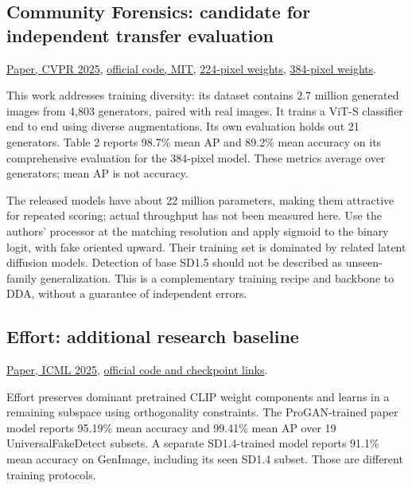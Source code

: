 \subsection{Community Forensics: candidate for independent transfer
evaluation}\label{record-docs-image-defenders-md-community-forensics-candidate-for-independent-transfer-evaluation}

\href{https://arxiv.org/pdf/2411.04125v2}{Paper, CVPR 2025},
\href{https://github.com/JeongsooP/Community-Forensics}{official code,
MIT}, \href{https://huggingface.co/OwensLab/commfor-model-224}{224-pixel
weights},
\href{https://huggingface.co/OwensLab/commfor-model-384}{384-pixel
weights}.

This work addresses training diversity: its dataset contains 2.7 million
generated images from 4,803 generators, paired with real images. It
trains a ViT-S classifier end to end using diverse augmentations. Its
own evaluation holds out 21 generators. Table 2 reports 98.7\% mean AP
and 89.2\% mean accuracy on its comprehensive evaluation for the
384-pixel model. These metrics average over generators; mean AP is not
accuracy.

The released models have about 22 million parameters, making them
attractive for repeated scoring; actual throughput has not been measured
here. Use the authors' processor at the matching resolution and apply
sigmoid to the binary logit, with fake oriented upward. Their training
set is dominated by related latent diffusion models. Detection of base
SD1.5 should not be described as unseen-family generalization. This is a
complementary training recipe and backbone to DDA, without a guarantee
of independent errors.

\subsection{Effort: additional research
baseline}\label{record-docs-image-defenders-md-effort-additional-research-baseline}

\href{https://arxiv.org/pdf/2411.15633v4}{Paper, ICML 2025},
\href{https://github.com/YZY-stack/Effort-AIGI-Detection}{official code
and checkpoint links}.

Effort preserves dominant pretrained CLIP weight components and learns
in a remaining subspace using orthogonality constraints. The
ProGAN-trained paper model reports 95.19\% mean accuracy and 99.41\%
mean AP over 19 UniversalFakeDetect subsets. A separate SD1.4-trained
model reports 91.1\% mean accuracy on GenImage, including its seen SD1.4
subset. Those are different training protocols.

